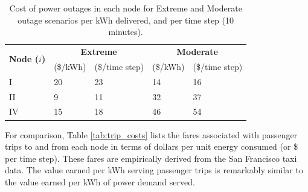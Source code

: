 \documentclass[journal]{IEEEtran}
\begin{document}
\begin{table}[!htbp]
    \renewcommand{\arraystretch}{1}
    \caption{Cost of power outages in each node for Extreme and Moderate outage scenarios per kWh delivered, and per time step (10 minutes).}
    \label{tab:outage_costs}
    \centering
    \def\colmargin{6.75cm}
    \begin{tabular}{lllll}
    \hline
    \multirow{2}{*}{\textbf{Node ($i$)}} & \multicolumn{2}{c}{\textbf{Extreme}} & \multicolumn{2}{c}{\textbf{Moderate}} \\
     & (\$/kWh) & (\$/time step) & (\$/kWh) & (\$/time step) \\
    \hline
    I  & 20 & 23 & 14 & 16 \\
    II & 9  & 11 & 32 & 37 \\
    IV & 15 & 18 & 46 & 54 \\
    \hline
    \end{tabular}
\end{table}

For comparison, Table \ref{tab:trip_costs} lists the fares associated with passenger trips to and from each node in terms of dollars per unit energy consumed (or \$ per time step). These fares are empirically derived from the San Francisco taxi data. The value earned per kWh serving passenger trips is remarkably similar to the value earned per kWh of power demand served.
\end{document}
